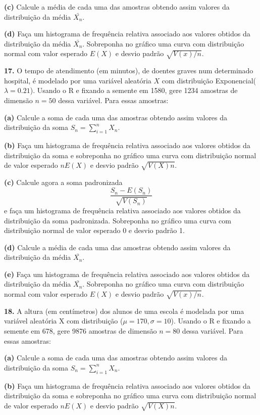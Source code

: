 \documentclass[
]{book}
\begin{document}
\textbf{(c)} Calcule a média de cada uma das amostras obtendo assim valores
da distribuição da média \(\bar{X_{n}}\).

\textbf{(d)} Faça um histograma de frequência relativa associado aos valores
obtidos da distribuição da média \(\bar{X_{n}}\). Sobreponha no gráfico
uma curva com distribuição normal com valor esperado \(E(X)\) e desvio
padrão \(\sqrt{V(x)/n}\).

\textbf{17.} O tempo de atendimento (em minutos), de doentes graves num
determinado hospital, é modelado por uma variável aleatória \(X\) com
distribuição Exponencial(\(\lambda=0.21\)). Usando o R e fixando a semente
em 1580, gere 1234 amostras de dimensão \(n=50\) dessa variável. Para
essas amostras:

\textbf{(a)} Calcule a soma de cada uma das amostras obtendo assim valores da
distribuição da soma \(S_{n} = \sum_{i=1}^{n}X_{n}\).

\textbf{(b)} Faça um histograma de frequência relativa associado aos valores
obtidos da distribuição da soma e sobreponha no gráfico uma curva com
distribuição normal de valor esperado \(nE(X)\) e desvio padrão
\(\sqrt{V(X)n}\).

\textbf{(c)} Calcule agora a soma padronizada
\[\frac{S_{n}-E(S_{n})}{\sqrt{V(S_{n})}}\] e faça um histograma de
frequência relativa associado aos valores obtidos da distribuição da
soma padronizada. Sobreponha no gráfico uma curva com distribuição
normal de valor esperado 0 e desvio padrão 1.

\textbf{(d)} Calcule a média de cada uma das amostras obtendo assim valores
da distribuição da média \(\bar{X_{n}}\).

\textbf{(e)} Faça um histograma de frequência relativa associado aos valores
obtidos da distribuição da média \(\bar{X_{n}}\). Sobreponha no gráfico
uma curva com distribuição normal com valor esperado \(E(X)\) e desvio
padrão \(\sqrt{V(x)/n}\).

\textbf{18.} A altura (em centímetros) dos alunos de uma escola é modelada
por uma variável aleatória X com distribuição
(\(\mu=170, \sigma=10\)). Usando o R e fixando a semente em
678, gere 9876 amostras de dimensão \(n=80\) dessa variável. Para essas
amostras:

\textbf{(a)} Calcule a soma de cada uma das amostras obtendo assim valores da
distribuição da soma \(S_{n} = \sum_{i=1}^{n}X_{n}\).

\textbf{(b)} Faça um histograma de frequência relativa associado aos valores
obtidos da distribuição da soma e sobreponha no gráfico uma curva com
distribuição normal de valor esperado \(nE(X)\) e desvio padrão
\(\sqrt{V(X)n}\).
\end{document}
